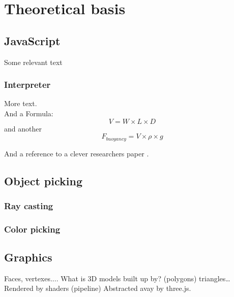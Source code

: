 \chapter{Theoretical basis}

\section{JavaScript}

Some relevant text

\subsection{Interpreter}
More text. \\
And a Formula:
\begin{equation}
V=W\times L\times D
\label{eq1}
\end{equation}
and another
\begin{equation}
F_{buoyancy}=V\times \rho\times g
\label{eq1}
\end{equation}

And a reference to a clever researchers paper \citep{hydrodynamics}.

\section{Object picking}
\subsection{Ray casting}
\subsection{Color picking}

\section{Graphics}
Faces, vertexes.... What is 3D models built up by? (polygons) triangles\dots
Rendered by shaders (pipeline)
Abstracted avay by three.js.
